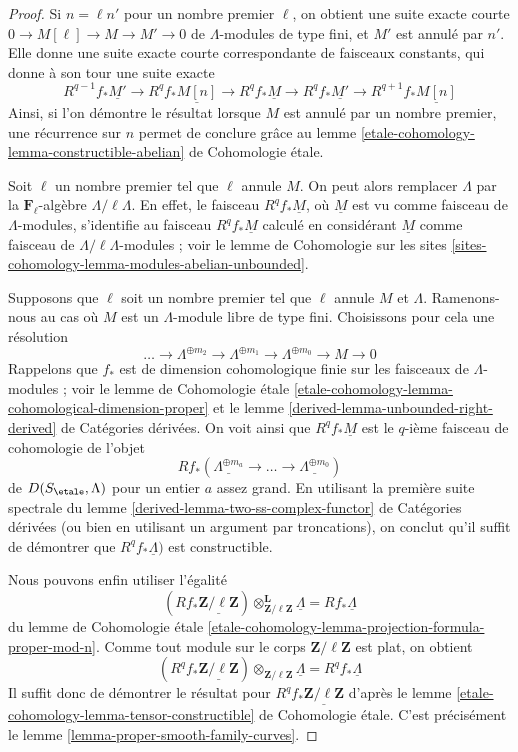 \begin{proof}
Si $n = \ell n'$ pour un nombre premier $\ell$, on obtient
une suite exacte courte $0 \to M[\ell] \to M \to M' \to 0$
de $\Lambda$-modules de type fini, et $M'$ est annulé par $n'$.
Elle donne une suite exacte courte correspondante de faisceaux
constants, qui donne à son tour une suite exacte
$$
R^{q - 1}f_*\underline{M'} \to
R^qf_*\underline{M[n]} \to
R^qf_*\underline{M} \to
R^qf_*\underline{M'} \to
R^{q + 1}f_*\underline{M[n]}
$$
Ainsi, si l'on démontre le résultat lorsque $M$ est annulé par
un nombre premier, une récurrence sur $n$ permet de conclure grâce au
lemme \ref{etale-cohomology-lemma-constructible-abelian} de Cohomologie étale.

\medskip\noindent
Soit $\ell$ un nombre premier tel que $\ell$ annule $M$.
On peut alors remplacer $\Lambda$ par la $\mathbf{F}_\ell$-algèbre
$\Lambda/\ell \Lambda$. En effet, le faisceau $R^qf_*\underline{M}$,
où $\underline{M}$ est vu comme faisceau de $\Lambda$-modules,
s'identifie au faisceau $R^qf_*\underline{M}$ calculé en
considérant $\underline{M}$ comme faisceau de $\Lambda/\ell \Lambda$-modules ; voir le
lemme de Cohomologie sur les sites
\ref{sites-cohomology-lemma-modules-abelian-unbounded}.

\medskip\noindent
Supposons que $\ell$ soit un nombre premier tel que $\ell$ annule $M$ et $\Lambda$.
Ramenons-nous au cas où $M$ est un $\Lambda$-module libre de type fini.
Choisissons pour cela une résolution
$$
\ldots \to
\Lambda^{\oplus m_2} \to
\Lambda^{\oplus m_1} \to
\Lambda^{\oplus m_0} \to
M \to 0
$$
Rappelons que $f_*$ est de dimension cohomologique finie sur les faisceaux de
$\Lambda$-modules ; voir le
lemme de Cohomologie étale
\ref{etale-cohomology-lemma-cohomological-dimension-proper}
et le
lemme \ref{derived-lemma-unbounded-right-derived} de Catégories dérivées.
On voit ainsi que $R^qf_*\underline{M}$ est le $q$-ième faisceau
de cohomologie de l'objet
$$
Rf_*(\underline{\Lambda^{\oplus m_a}} \to \ldots \to
\underline{\Lambda^{\oplus m_0}})
$$
de $D(S_\etale, \Lambda)$ pour un entier $a$ assez grand.
En utilisant la première suite spectrale du
lemme \ref{derived-lemma-two-ss-complex-functor} de Catégories dérivées
(ou bien en utilisant un argument par troncations),
on conclut qu'il suffit de démontrer que $R^qf_*\underline{\Lambda})$
est constructible.

\medskip\noindent
Nous pouvons enfin utiliser l'égalité
$$
(Rf_*\underline{\mathbf{Z}/\ell\mathbf{Z}})
\otimes_{\mathbf{Z}/\ell\mathbf{Z}}^\mathbf{L} \underline{\Lambda} =
Rf_*\underline{\Lambda}
$$
du lemme de Cohomologie étale
\ref{etale-cohomology-lemma-projection-formula-proper-mod-n}.
Comme tout module sur le corps $\mathbf{Z}/\ell\mathbf{Z}$
est plat, on obtient
$$
(R^qf_*\underline{\mathbf{Z}/\ell\mathbf{Z}})
\otimes_{\mathbf{Z}/\ell\mathbf{Z}} \underline{\Lambda} =
R^qf_*\underline{\Lambda}
$$
Il suffit donc de démontrer le résultat pour
$R^qf_*\underline{\mathbf{Z}/\ell\mathbf{Z}}$
d'après le lemme \ref{etale-cohomology-lemma-tensor-constructible} de Cohomologie étale.
C'est précisément le lemme \ref{lemma-proper-smooth-family-curves}.
\end{proof}






